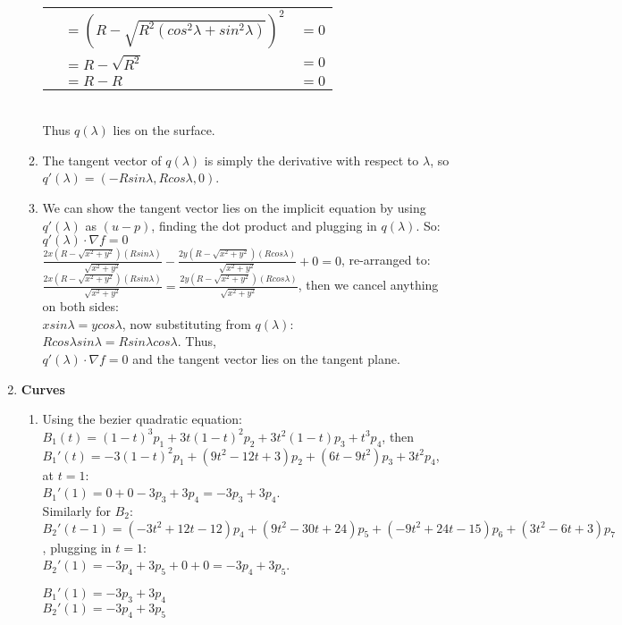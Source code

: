 \documentclass[12pt]{article}
\begin{document}
\begin{enumerate}
\begin{enumerate}
\begin{tabular}{l l l}
 & $= (R - \sqrt{R^2(cos^2\lambda + sin^2\lambda)})^2$ & $= 0$\\
 & $= R - \sqrt{R^2}$ & $= 0$\\
 & $= R - R$ & $= 0$\\
\end{tabular}\\
Thus $q(\lambda)$ lies on the surface.
\item %
The tangent vector of $q(\lambda)$ is simply the derivative with respect to $\lambda$, so $q'(\lambda) = (-Rsin\lambda, Rcos\lambda, 0)$.
\item %
We can show the tangent vector lies on the implicit equation by using $q'(\lambda)$ as $(u-p)$, finding the dot product and plugging in $q(\lambda)$. So:\\
$q'(\lambda)\cdot \nabla f = 0$\\
$\frac{2x(R-\sqrt{x^2 + y^2})(Rsin\lambda)}{\sqrt{x^2 + y^2}} - \frac{2y(R-\sqrt{x^2 + y^2})(Rcos\lambda)}{\sqrt{x^2 + y^2}} + 0 = 0$, re-arranged to:\\
$\frac{2x(R-\sqrt{x^2 + y^2})(Rsin\lambda)}{\sqrt{x^2 + y^2}} = \frac{2y(R-\sqrt{x^2 + y^2})(Rcos\lambda)}{\sqrt{x^2 + y^2}}$, then we cancel anything on both sides:\\
$xsin\lambda = ycos\lambda$, now substituting from $q(\lambda)$:\\
$Rcos\lambda sin\lambda  = Rsin\lambda cos\lambda$. Thus,\\
$q'(\lambda)\cdot \nabla f = 0$ and the tangent vector lies on the tangent plane.
\end{enumerate}
\item \textbf{Curves}
\begin{enumerate}
\item %
Using the bezier quadratic equation:\\
$B_1(t) = (1-t)^3p_1 + 3t(1-t)^2p_2 + 3t^2(1-t)p_3 + t^3p_4$, then\\
$B_1'(t) = -3(1-t)^2p_1 + (9t^2 - 12t + 3)p_2 + (6t-9t^2)p_3 + 3t^2p_4$, at $t = 1$:\\
$B_1'(1) = 0 + 0 - 3p_3 + 3p_4 = -3p_3 + 3p_4$.\\ Similarly for $B_2$:\\
$B_2'(t-1) = (-3t^2 + 12t - 12)p_4 + (9t^2 - 30t + 24)p_5 + (-9t^2 + 24t - 15)p_6 + (3t^2 - 6t + 3)p_7$, plugging in $t = 1$:\\
$B_2'(1) = -3p_4 + 3p_5 + 0 + 0 = -3p_4 + 3p_5$.\begin{center}
$B_1'(1) = -3p_3 + 3p_4$\\ $B_2'(1) = -3p_4 + 3p_5$

\end{center}
\end{enumerate}
\end{enumerate}
\end{document}
